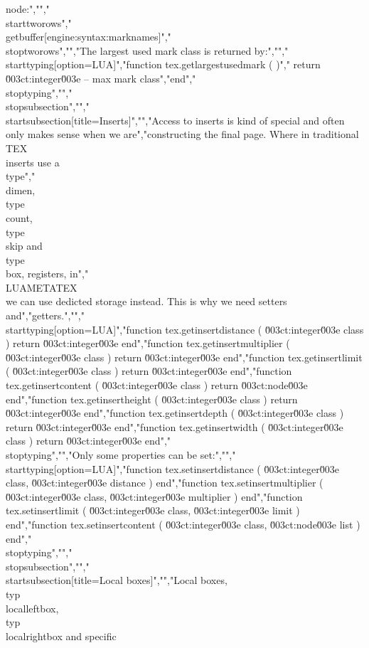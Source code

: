 node:","","\\starttworows","\\getbuffer[engine:syntax:marknames]","\\stoptworows","","The largest used mark class is returned by:","","\\starttyping[option=LUA]","function tex.getlargestusedmark ( )","    return \u003ct:integer\u003e -- max mark class","end","\\stoptyping","","\\stopsubsection","","\\startsubsection[title=Inserts]","","Access to inserts is kind of special and often only makes sense when we are","constructing the final page. Where in traditional \\TEX\\ inserts use a \\type","{\\dimen}, \\type {\\count}, \\type {\\skip} and \\type {\\box}, registers, in","\\LUAMETATEX\\ we can use dedicted storage instead. This is why we need setters and","getters.","","\\starttyping[option=LUA]","function tex.getinsertdistance   ( \u003ct:integer\u003e class ) return \u003ct:integer\u003e end","function tex.getinsertmultiplier ( \u003ct:integer\u003e class ) return \u003ct:integer\u003e end","function tex.getinsertlimit      ( \u003ct:integer\u003e class ) return \u003ct:integer\u003e end","function tex.getinsertcontent    ( \u003ct:integer\u003e class ) return \u003ct:node\u003e    end","function tex.getinsertheight     ( \u003ct:integer\u003e class ) return \u003ct:integer\u003e end","function tex.getinsertdepth      ( \u003ct:integer\u003e class ) return \u003ct:integer\u003e end","function tex.getinsertwidth      ( \u003ct:integer\u003e class ) return \u003ct:integer\u003e end","\\stoptyping","","Only some properties can be set:","","\\starttyping[option=LUA]","function tex.setinsertdistance   ( \u003ct:integer\u003e class, \u003ct:integer\u003e distance   ) end","function tex.setinsertmultiplier ( \u003ct:integer\u003e class, \u003ct:integer\u003e multiplier ) end","function tex.setinsertlimit      ( \u003ct:integer\u003e class, \u003ct:integer\u003e limit      ) end","function tex.setinsertcontent    ( \u003ct:integer\u003e class, \u003ct:node\u003e    list       ) end","\\stoptyping","","\\stopsubsection","","\\startsubsection[title=Local boxes]","","Local boxes, \\typ {\\localleftbox}, \\typ {\\localrightbox} and specific 
